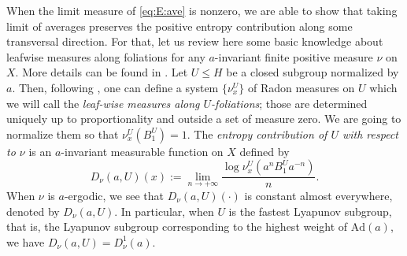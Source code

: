 \documentclass[reqno,12pt]{amsart}
\theoremstyle{definition}
\numberwithin{equation}{section}
\newcommand{\cM}{\mathcal{M}}
\newcommand{\Ad}{\mathrm{Ad}}
\newcommand {\comm}[1]   {\textcolor{red}{#1}}
\newcommand {\neww}[1]   {\textcolor{purple}{#1}}
\newcommand {\equ}[1]     {\eqref{eq:#1}}
\begin{document}
{{When the limit measure of \equ{E:ave} is nonzero,} %
we are able to show that taking limit of averages preserves the positive entropy contribution along some transversal direction. 
For that, let us %
review here some basic knowledge about leafwise measures along foliations for any $a$-invariant finite positive measure $\nu$ on $X$. More details can be found in \cite{EL10}. Let $U\leq H$ be a closed subgroup normalized by $a$.
Then, following \cite[Section 6]{EL10}, one can define  a system $\{\nu^U_x\}$ of Radon measures on $U$ which we will call the \textit{leaf-wise measures along $U$-foliations}; those  are determined uniquely up to proportionality and outside a set of measure zero.
We are going to normalize them so that $\nu^U_x(B^U_1)=1$. The \textit{entropy contribution of $U$ with respect to $\nu$} is an $a$-invariant measurable function on $X$ defined by $$
D_\nu(a,U)(x):=\lim\limits_{n\to +\infty}\frac{\log\nu^U_x(a^nB^U_1a^{-n})}{n}.
$$
When $\nu$ is $a$-ergodic, we see that $D_\nu(a,U)(\cdot)$ is constant almost everywhere, denoted by $D_\nu(a,U)$. In particular, when $U$ is the fastest Lyapunov subgroup, %
that is, the Lyapunov subgroup corresponding to the highest weight of $\Ad(a)$, we have $D_\nu(a,U)=D^1_\nu(a)$.




}
\end{document}
